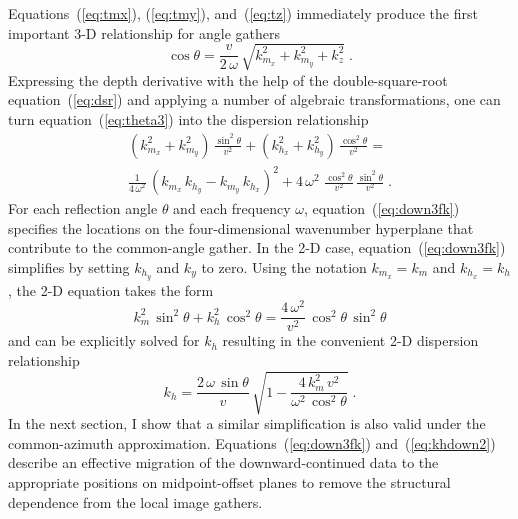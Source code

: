 Equations~(\ref{eq:tmx}), (\ref{eq:tmy}), and~(\ref{eq:tz}) immediately
produce the first important 3-D relationship for angle gathers
\begin{equation}
  \label{eq:theta3}
  \cos{\theta} = 
  \frac{v}{2\,\omega}\,\sqrt{
  k_{m_x}^2 +
  k_{m_y}^2 +
  k_z^2}\;.
\end{equation}
Expressing the depth derivative with the help of the double-square-root
equation~(\ref{eq:dsr}) and applying a number of algebraic transformations,
one can turn equation~(\ref{eq:theta3}) into the dispersion relationship
\begin{equation}
\boxed{
  \begin{gathered}
    \left(k_{m_x}^2 + k_{m_y}^2\right)\,\frac{\sin^2{\theta}}{v^2} +
    \left(k_{h_x}^2 + k_{h_y}^2\right)\,\frac{\cos^2{\theta}}{v^2}
    =  \\
    \frac{1}{4\,\omega^2}\,
    \left(k_{m_x}\,k_{h_y} - k_{m_y}\,k_{h_x}\right)^2 
    + 4\,\omega^2\,\,\frac{\cos^2{\theta}}{v^2}\,\frac{\sin^2{\theta}}{v^2}\;.
  \end{gathered}
}
\label{eq:down3fk}
\end{equation}
For each reflection angle $\theta$ and each frequency $\omega$,
equation~(\ref{eq:down3fk}) specifies the locations on the
four-dimensional 
wavenumber hyperplane that contribute to the common-angle gather. In
the 2-D case, equation~(\ref{eq:down3fk}) simplifies by setting
$k_{h_y}$ and $k_y$ to zero. Using the notation $k_{m_x}=k_m$ and
$k_{h_x}=k_h$, the 2-D equation takes the form
\begin{equation}
  \label{eq:down2fk}
  k_m^2\,\sin^2{\theta} +
  k_h^2\,\cos^2{\theta}
  = \frac{4\,\omega^2}{v^2}\,\cos^2{\theta}\,\sin^2{\theta}
\end{equation}
and can be explicitly solved for $k_h$ resulting in the convenient 
2-D dispersion relationship
\begin{equation}
  \label{eq:khdown2}
  k_h = \frac{2\,\omega\,\sin{\theta}}{v}\,
  \sqrt{1-\frac{4\,k_m^2\,v^2}{\omega^2\,\cos^2{\theta}}}\;.
\end{equation}
In the next section, I show that a similar simplification is also valid
under the common-azimuth approximation. Equations~(\ref{eq:down3fk})
and~(\ref{eq:khdown2}) describe an effective migration of the
downward-continued data to the appropriate positions on midpoint-offset planes
to remove the structural dependence from the local image gathers.

